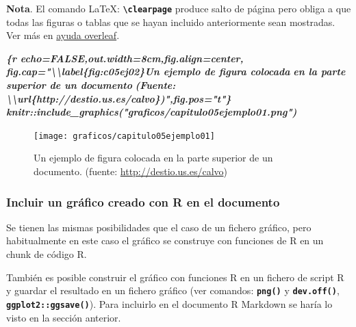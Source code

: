 \documentclass[12pt,a4paper,oneside,]{article}
\newenvironment{Shaded}{\begin{snugshade}}{\end{snugshade}}
\newcommand{\InformationTok}[1]{\textcolor[rgb]{0.56,0.35,0.01}{\textbf{\textit{#1}}}}
\numberwithin{dummy}{section}
\theoremstyle{ocrenumbox}
\theoremstyle{blacknumex}
\theoremstyle{blacknumbox}
\theoremstyle{ocrenum}
\theoremstyle{ocrenum}
\begin{document}
\textbf{Nota}. El comando LaTeX:
\textbf{\texttt{\textbackslash{}clearpage}} produce salto de página pero
obliga a que todas las figuras o tablas que se hayan incluido
anteriormente sean mostradas. Ver más en
\href{https://es.overleaf.com/learn/latex/Line_breaks_and_blank_spaces\#Espacios_verticales_en_blanco}{ayuda
overleaf}.

\begin{Shaded}
\begin{Highlighting}[]
\InformationTok{\textasciigrave{}\textasciigrave{}\textasciigrave{}\{r echo=FALSE,out.width=\textquotesingle{}8cm\textquotesingle{},fig.align=\textquotesingle{}center\textquotesingle{},}
\InformationTok{fig.cap="\textbackslash{}\textbackslash{}label\{fig:c05ej02\}Un ejemplo de figura colocada }
\InformationTok{en la parte superior de un documento }
\InformationTok{(Fuente: \textbackslash{}\textbackslash{}url\{http://destio.us.es/calvo\})",fig.pos="t"\}}
\InformationTok{knitr::include\_graphics("graficos/capitulo05ejemplo01.png")}
\InformationTok{\textasciigrave{}\textasciigrave{}\textasciigrave{}}
\end{Highlighting}
\end{Shaded}

\begin{figure}[t]

{\centering \texttt{[image: graficos/capitulo05ejemplo01]} 

}

\caption{\label{fig:c05ej02}Un ejemplo de figura colocada en la parte superior de un documento. (fuente: \url{http://destio.us.es/calvo})}\label{fig:unnamed-chunk-23}
\end{figure}

\hypertarget{incluir-un-gruxe1fico-creado-con-r-en-el-documento}{%
\subsubsection{Incluir un gráfico creado con R en el
documento}\label{incluir-un-gruxe1fico-creado-con-r-en-el-documento}}

Se tienen las mismas posibilidades que el caso de un fichero gráfico,
pero habitualmente en este caso el gráfico se construye con funciones de
R en un chunk de código R.

También es posible construir el gráfico con funciones R en un fichero de
script R y guardar el resultado en un fichero gráfico (ver comandos:
\textbf{\texttt{png()}} y \textbf{\texttt{dev.off()}},
\textbf{\texttt{ggplot2::ggsave()}}). Para incluirlo en el documento R
Markdown se haría lo visto en la sección anterior.
\end{document}
